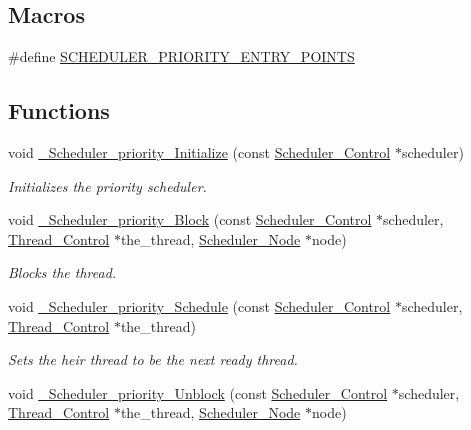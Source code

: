 \subsection*{Macros}
\begin{DoxyCompactItemize}
\item 
\#define \mbox{\hyperlink{group__RTEMSScoreSchedulerDPS_ga146e87fdcedc2532678dee635f2421ba}{S\+C\+H\+E\+D\+U\+L\+E\+R\+\_\+\+P\+R\+I\+O\+R\+I\+T\+Y\+\_\+\+E\+N\+T\+R\+Y\+\_\+\+P\+O\+I\+N\+TS}}
\end{DoxyCompactItemize}
\subsection*{Functions}
\begin{DoxyCompactItemize}
\item 
void \mbox{\hyperlink{group__RTEMSScoreSchedulerDPS_ga623c461e2ff127d4c9619410d89dc31d}{\+\_\+\+Scheduler\+\_\+priority\+\_\+\+Initialize}} (const \mbox{\hyperlink{struct__Scheduler__Control}{Scheduler\+\_\+\+Control}} $\ast$scheduler)
\begin{DoxyCompactList}\small\item\em Initializes the priority scheduler. \end{DoxyCompactList}\item 
void \mbox{\hyperlink{group__RTEMSScoreSchedulerDPS_ga0ef8d30efe3b8106036c277fb1e6967e}{\+\_\+\+Scheduler\+\_\+priority\+\_\+\+Block}} (const \mbox{\hyperlink{struct__Scheduler__Control}{Scheduler\+\_\+\+Control}} $\ast$scheduler, \mbox{\hyperlink{struct__Thread__Control}{Thread\+\_\+\+Control}} $\ast$the\+\_\+thread, \mbox{\hyperlink{structScheduler__Node}{Scheduler\+\_\+\+Node}} $\ast$node)
\begin{DoxyCompactList}\small\item\em Blocks the thread. \end{DoxyCompactList}\item 
void \mbox{\hyperlink{group__RTEMSScoreSchedulerDPS_ga5f88549e443f989b9058f08f46eb4e8f}{\+\_\+\+Scheduler\+\_\+priority\+\_\+\+Schedule}} (const \mbox{\hyperlink{struct__Scheduler__Control}{Scheduler\+\_\+\+Control}} $\ast$scheduler, \mbox{\hyperlink{struct__Thread__Control}{Thread\+\_\+\+Control}} $\ast$the\+\_\+thread)
\begin{DoxyCompactList}\small\item\em Sets the heir thread to be the next ready thread. \end{DoxyCompactList}\item 
void \mbox{\hyperlink{group__RTEMSScoreSchedulerDPS_ga2a24da77012650161d32bed57eb5c128}{\+\_\+\+Scheduler\+\_\+priority\+\_\+\+Unblock}} (const \mbox{\hyperlink{struct__Scheduler__Control}{Scheduler\+\_\+\+Control}} $\ast$scheduler, \mbox{\hyperlink{struct__Thread__Control}{Thread\+\_\+\+Control}} $\ast$the\+\_\+thread, \mbox{\hyperlink{structScheduler__Node}{Scheduler\+\_\+\+Node}} $\ast$node)

\end{DoxyCompactItemize}
